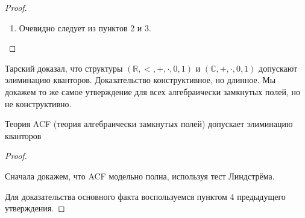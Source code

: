 \begin{proof}
\begin{enumerate}
       \begin{stat} %
        $T\cup\text{Diag}(\mathbb{C})\cup\{\varphi(\overline{d})\}$ имеет модель.
       \end{stat}
       \begin{proof}
           Доказываем от противного. Тогда для некоторого конечного подмножества $\Gamma$ $T\cup\{\delta_1(\overline{d},\ldots,\delta_n(\overline{d}))\}\cup\{\varphi(\overline{d})\}$ не имеет модели. Значит $T\models \bigwedge\delta_i(\overline{d})\rightarrow\neg\varphi{d}$, откуда $T\models \varphi(\overline{d})\rightarrow\bigvee\neg\delta_i(\overline{d})$.
           
           Тогда $\gamma=\bigvee\neg\delta_i(\overline{d})$ лежит в $\Gamma$. Значит $\mathbb{A}\models \gamma$, но по определению $\text{Diag}$ выполнено $\mathbb{A}\models \neg\gamma$. Противоречие
       \end{proof}
        
       Пусть $\mathbb{B}'$ -- модель, удовлетворяющая утверждению. Рассмотрим её обеднение $\mathbb{B}$ до структуры $\sigma$. Существует единственное вложение $g: \mathbb{C}\rightarrow \mathbb{B}$, переводящее $d_i$ в $d_i'$.

       Наконец, воспользуемся условием $\circledast$. По определению, в $\mathbb{A}$ $\varphi(f(\overline{d}))$ ложно, а в $\mathbb{B}$ $\varphi(g(\overline{d}))$ истинно. Противоречие.

    \item Очевидно следует из пунктов 2 и 3.
    \end{enumerate}
\end{proof}


Тарский доказал, что структуры $(\mathbb{R}, <, +, \cdot, 0, 1)$ и $(\mathbb{C}, +, \cdot, 0, 1)$ допускают элиминацию кванторов. Доказательство конструктивное, но длинное. Мы докажем то же самое утверждение для всех алгебраически замкнутых полей, но не конструктивно.

\begin{exmpl}
    Теория ACF (теория алгебраически замкнутых полей) допускает элиминацию кванторов
\end{exmpl}

\begin{proof}\

    Сначала докажем, что ACF модельно полна, используя тест Линдстрёма.

    Для доказательства основного факта воспользуемся пунктом 4 предыдущего утверждения.
\end{proof}
